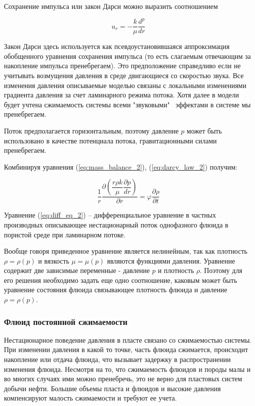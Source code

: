 Сохранение импульса или закон Дарси можно выразить соотношением  


\begin{equation} \label{eq:darcy_law_2}
 u_r=-\frac{k}{\mu}\frac{d^p}{dr}
\end{equation}

Закон Дарси здесь используется как псевдоустановившаяся аппроксимация обобщенного уравнения сохранения импульса (то есть слагаемым отвечающим за накопление импульса пренебрегаем). Это предположение справедливо если не учитывать возмущения давления в среде двигающиеся со скоростью звука. Все изменения давления описываемые моделью связаны с локальными изменениями градиента давления за счет ламинарного режима потока. Хотя далее в модели будет учтена сжимаемость системы всеми "звуковыми" \ эффектами в системе мы пренебрегаем.

Поток предполагается горизонтальным, поэтому давление \( p\) может быть использовано в качестве потенциала потока, гравитационными силами пренебрегаем.

Комбинируя уравнения (\ref{eq:mass_balance_2}), (\ref{eq:darcy_law_2})  получим:

\begin{equation} \label{eq:diff_eq_2}
\frac{1}{r}\frac{\partial\left( \dfrac{r\rho k}{\mu}\dfrac{\partial p}{dr}\right)}{\partial r}=\varphi\frac{\partial \rho}{\partial t}
\end{equation}

Уравнение (\ref{eq:diff_eq_2}) -- дифференциальное уравнение в частных производных описывающее нестационарный поток однофазного флюида в пористой среде при ламинарном потоке. 

Вообще говоря приведенное уравнение является нелинейным, так как плотность $\rho = \rho(p)$ и вязкость $\mu = \mu(p)$ являются функциями давления. Уравнение содержит две зависимые переменные - давление $p$ и плотность $\rho$. Поэтому для его решения необходимо задать еще одно соотношение, каковым может быть уравнение состояния флюида связывающее плотность флюида и давление $\rho = \rho(p)$. 

\subsubsection{Флюид постоянной сжимаемости}
 
Нестационарное поведение давления в пласте связано со сжимаемостью системы. При изменении давления в какой то точке, часть флюида сжимается, происходит накопление или отдача флюида, что вызывает задержку в распространении изменения флюида. Несмотря на то, что сжимаемость флюидов и породы малы и во многих случаях ими можно пренебречь, это не верно для пластовых систем добычи нефти. Большие объемы пласта и флюидов и высокие давления компенсируют малость сжимаемости и требуют ее учета. 

